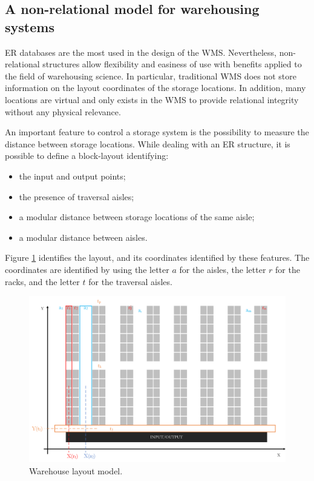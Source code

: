 \subsection{A non-relational model for warehousing systems} \label{secNonRelStructWh}

ER databases are the most used in the design of the WMS. Nevertheless, non-relational structures allow flexibility and easiness of use with benefits applied to the field of warehousing science. In particular, traditional WMS does not store information on the layout coordinates of the storage locations. In addition, many locations are virtual and only exists in the WMS to provide relational integrity without any physical relevance. \par

An important feature to control a storage system is the possibility to measure the distance between storage locations. While dealing with an ER structure, it is possible to define a block-layout identifying:

\begin{itemize}
    \item the input and output points;
    \item the presence of traversal aisles;
    \item a modular distance between storage locations of the same aisle;
    \item a modular distance between aisles.
\end{itemize}

Figure \ref{fig_layout_wh} identifies the layout, and its coordinates identified by these features. The coordinates are identified by using the letter $a$ for the aisles, the letter $r$ for the racks, and the letter $t$ for the traversal aisles.

\begin{figure}[hbt!]
\centering
\includegraphics[width=1\textwidth]{SectionWarehouses/diagnsticModels_figures/fig_layout.png}
\captionsetup{type=figure}
\caption{Warehouse layout model.}
\label{fig_layout_wh}
\end{figure}

